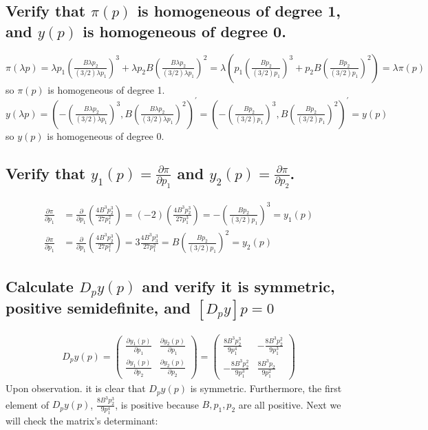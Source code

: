 \documentclass[11pt]{article} %
\begin{document}
\subsection{Verify that $\pi(p)$ is homogeneous of degree 1, and $y(p)$ is homogeneous of degree 0.}
$\pi(\lambda p) = \lambda p_1\left(\frac{B\lambda p_2}{ (3/2) \lambda p_1} \right)^{3} + \lambda p_2 B\left(\frac{B\lambda p_2}{ (3/2) \lambda p_1} \right)^{2} = \lambda (p_1\left(\frac{Bp_2}{ (3/2) p_1} \right)^{3} + p_2 B\left(\frac{Bp_2}{ (3/2) p_1} \right)^{2}) = \lambda \pi(p)$ so $\pi(p)$ is homogeneous of degree 1. \\
$y(\lambda p) = \left(-\left(\frac{B \lambda p_2}{ (3/2) \lambda p_1} \right)^{3},B\left(\frac{B\lambda p_2}{ (3/2) \lambda p_1} \right)^{2}\right)^{'} = \left(-\left(\frac{Bp_2}{ (3/2) p_1} \right)^{3},B\left(\frac{Bp_2}{ (3/2) p_1} \right)^{2}\right)^{'} = y(p) $ so $y(p)$ is homogeneous of degree 0.

\subsection{Verify that $y_1(p) = \frac{\partial \pi}{\partial p_1}$ and $y_2(p) = \frac{\partial \pi}{\partial p_2}$.}
\begin{align*}
\frac{\partial \pi}{\partial p_1} &= \frac{\partial }{\partial p_1}\left( \frac{4B^3p_{2}^{3}}{27p_{1}^{2}} \right) =(-2) \left( \frac{4B^3p_{2}^{3}}{27p_{1}^{3}} \right) = -\left(\frac{Bp_2}{ (3/2) p_1} \right)^{3} = y_1(p) \\
\frac{\partial \pi}{\partial p_1} &=  \frac{\partial }{\partial p_1}\left( \frac{4B^3p_{2}^{3}}{27p_{1}^{2}} \right) = 3\frac{4B^3p_{3}^{3}}{27p_{1}^{2}} = B\left(\frac{Bp_2}{ (3/2) p_1} \right)^{2} = y_2(p)
\end{align*}

\subsection{Calculate $D_p y(p)$ and verify it is symmetric, positive semidefinite, and $[D_py]p = 0$}
\begin{align*}
D_p y(p) = \begin{pmatrix} \frac{\partial y_1(p)}{\partial p_1}& \frac{\partial y_2(p)}{\partial p_1} \\ \frac{\partial y_1(p)}{\partial p_2} & \frac{\partial y_2(p)}{\partial p_2} \end{pmatrix} = \begin{pmatrix} \frac{8B^3p_{2}^{3}}{9p_{1}^{4}} & - \frac{8B^3p_{2}^{2}}{9p_{1}^{3}}\\ -\frac{8B^3p_{2}^{2}}{ 9 p_{1}^{3}}& \frac{8B^3 p_2}{9 p_{1}^{2}} \end{pmatrix}
\end{align*}
Upon observation. it is clear that $D_p y(p)$ is symmetric. Furthermore, the first element of $D_p y(p)$, $\frac{8B^3p_{2}^{3}}{9p_{1}^{4}}$, is positive because $B,p_1,p_2$ are all positive. Next we will check the matrix's determinant:
\end{document}
